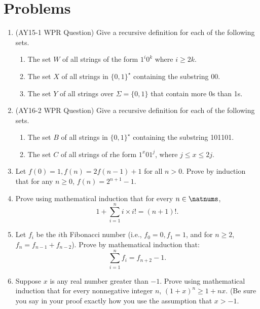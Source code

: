 \section{Problems}

\begin{enumerate}
	\item (AY15-1 WPR Question) Give a recursive definition for each of the following sets.
	\begin{enumerate}
		\item The set $W$ of all strings of the form $1^i 0^k$ where $i \ge 2k$.
		\item The set $X$ of all strings in $\{0,1\}^\star$ containing the substring 00.
		\item The set $Y$ of all strings over $\Sigma = \{0,1\}$ that contain more 0s than 1s.
	\end{enumerate}

	\item (AY16-2 WPR Question) Give a recursive definition for each of the following sets.
	\begin{enumerate}
		\item The set $B$ of all strings in $\{0,1\}^\star$ containing the substring 101101.
		\item The set $C$ of all strings of rhe form $1^x 01^j$, where $j \le x \le 2j$. 
	\end{enumerate}
	
	\item Let $f(0) = 1, f(n) = 2f(n-1)+1$ for all $n > 0$.
	Prove by induction that for any $n \ge 0$, $f(n) = 2^{n+1} - 1$.
	
	\item Prove using mathematical induction that for every $n \in \natnums$,
	\[
		1 + \sum_{i=1}^{n} i \times i! = (n+1)!.
	\]
	
	\item Let $f_i$ be the $i$th Fibonacci number (i.e., $f_0 = 0, f_1 = 1$, and for $n \ge 2$, $f_n = f_{n-1} + f_{n-2}$).
	Prove by mathematical induction that:
	\[
		\sum_{i=1}^{n} f_i = f_{n+2} - 1.
	\]
	
	\item Suppose $x$ is any real number greater than $-1$. Prove using mathematical induction that for every nonnegative integer $n$, $(1+x)^n\ge1+nx$. (Be sure you say in your proof exactly how you use the assumption that $x>-1$.
	
\end{enumerate}